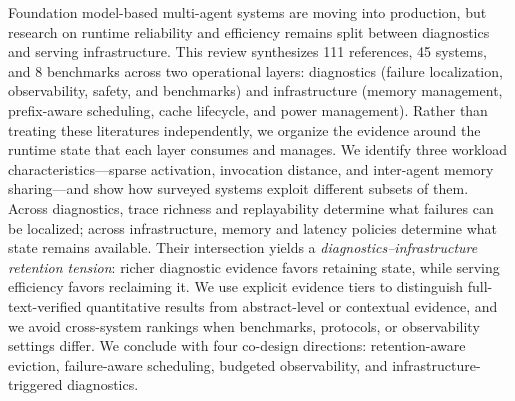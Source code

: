 Foundation model-based multi-agent systems are moving into production, but research on runtime reliability and efficiency remains split between diagnostics and serving infrastructure. This review synthesizes 111 references, 45 systems, and 8 benchmarks across two operational layers: diagnostics (failure localization, observability, safety, and benchmarks) and infrastructure (memory management, prefix-aware scheduling, cache lifecycle, and power management). Rather than treating these literatures independently, we organize the evidence around the runtime state that each layer consumes and manages. We identify three workload characteristics---sparse activation, invocation distance, and inter-agent memory sharing---and show how surveyed systems exploit different subsets of them. Across diagnostics, trace richness and replayability determine what failures can be localized; across infrastructure, memory and latency policies determine what state remains available. Their intersection yields a \emph{diagnostics--infrastructure retention tension}: richer diagnostic evidence favors retaining state, while serving efficiency favors reclaiming it. We use explicit evidence tiers to distinguish full-text-verified quantitative results from abstract-level or contextual evidence, and we avoid cross-system rankings when benchmarks, protocols, or observability settings differ. We conclude with four co-design directions: retention-aware eviction, failure-aware scheduling, budgeted observability, and infrastructure-triggered diagnostics.

